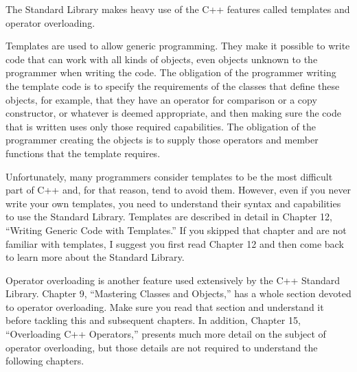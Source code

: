 
The Standard Library makes heavy use of the C++ features called templates and operator overloading.


Templates are used to allow generic programming. They make it possible to write code that can work with all kinds of objects, even objects unknown to the programmer when writing the code. The obligation of the programmer writing the template code is to specify the requirements of the classes that define these objects, for example, that they have an operator for comparison or a copy constructor, or whatever is deemed appropriate, and then making sure the code that is written uses only those required capabilities. The obligation of the programmer creating the objects is to supply those operators and member functions that the template requires.

Unfortunately, many programmers consider templates to be the most difficult part of C++ and, for that reason, tend to avoid them. However, even if you never write your own templates, you need to understand their syntax and capabilities to use the Standard Library. Templates are described in detail in Chapter 12, “Writing Generic Code with Templates.” If you skipped that chapter and are not familiar with templates, I suggest you first read Chapter 12 and then come back to learn more about the Standard Library.


Operator overloading is another feature used extensively by the C++ Standard Library. Chapter 9, “Mastering Classes and Objects,” has a whole section devoted to operator overloading. Make sure you read that section and understand it before tackling this and subsequent chapters. In addition, Chapter 15, “Overloading C++ Operators,” presents much more detail on the subject of operator overloading, but those details are not required to understand the following chapters.
